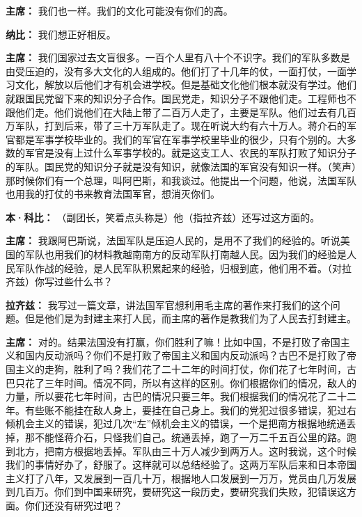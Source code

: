 \begin{duihua}
\item[\textbf{主席：}] 我们也一样。我们的文化可能没有你们的高。

\item[\textbf{纳比：}] 我们想正好相反。

\item[\textbf{主席：}] 我们国家过去文盲很多。一百个人里有八十个不识字。我们的军队多数是由受压迫的，没有多大文化的人组成的。他们打了十几年的仗，一面打仗，一面学习文化，解放以后他们才有机会进学校。但是基础文化他们根本就没有学过。他们就跟国民党留下来的知识分子合作。国民党走，知识分子不跟他们走。工程师也不跟他们走。他们说他们在大陆上带了二百万人走了，主要是军队。他们过去有几百万军队，打到后来，带了三十万军队走了。现在听说大约有六十万人。蒋介石的军官都是军事学校毕业的。我们的军官在军事学校里毕业的很少，只有个别的。大多数的军官是没有上过什么军事学校的。就是这支工人、农民的军队打败了知识分子的军队。国民党的知识分子就是没有知识，就像法国的军官没有知识一样。（笑声）那时候你们有一个总理，叫阿巴斯，和我谈过。他提出一个问题，他说，法国军队也用我的打仗的书来教育法国军官，想消灭你们。

\item[\textbf{本·科比：}] （副团长，笑着点头称是）他（指拉齐兹）还写过这方面的。

\item[\textbf{主席：}] 我跟阿巴斯说，法国军队是压迫人民的，是用不了我们的经验的。听说美国的军队也用我们的材料教越南南方的反动军队打南越人民。因为我们的经验是人民军队作战的经验，是人民军队积累起来的经验，归根到底，他们用不着。（对拉齐兹）你写过些什么书？

\item[\textbf{拉齐兹：}] 我写过一篇文章，讲法国军官想利用毛主席的著作来打我们的这个问题。但是他们是为封建主来打人民，而主席的著作是教我们为了人民去打封建主。

\item[\textbf{主席：}] 对的。结果法国没有打赢，你们胜利了嘛！比如中国，不是打败了帝国主义和国内反动派吗？你们不是打败了帝国主义和国内反动派吗？古巴不是打败了帝国主义的走狗，胜利了吗？我们花了二十二年的时间打仗，你们花了七年时间，古巴只花了三年时间。情况不同，所以有这样的区别。你们根据你们的情况，敌人的力量，所以要花七年时间，古巴的情况只要三年。我们根据我们的情况花了二十二年。有些账不能挂在敌人身上，要挂在自己身上。我们的党犯过很多错误，犯过右倾机会主义的错误，犯过几次“左”倾机会主义的错误，一个是把南方根据地统通丢掉，那不能怪蒋介石，只怪我们自己。统通丢掉，跑了一万二千五百公里的路。跑到北方，把南方根据地丢掉。军队由三十万人减少到两万人。这时我说，这个时候我们的事情好办了，舒服了。这样就可以总结经验了。这两万军队后来和日本帝国主义打了八年，又发展到一百几十万，根据地人口发展到一万万，党员由几万发展到几百万。你们到中国来研究，要研究这一段历史，要研究我们失败，犯错误这方面。你们还没有研究过吧？


\end{duihua}
